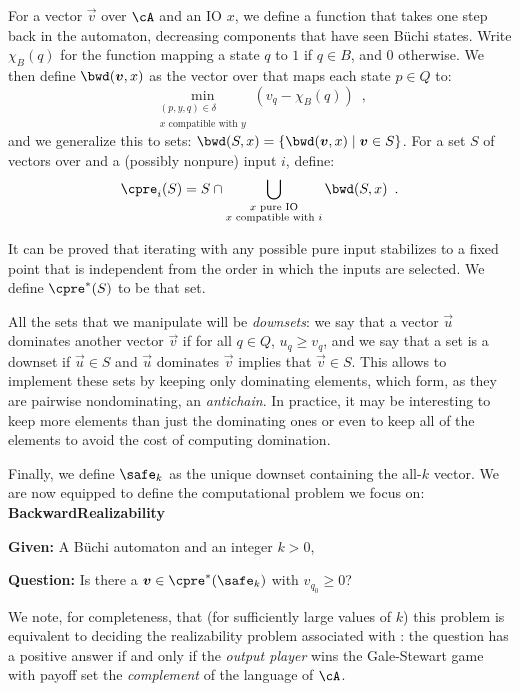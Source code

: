 \documentclass[runningheads,a4paper]{llncs}
\begin{document}
For a vector \(\vec{v}\) over \(\cA\) and an IO \(x\), we define a function that takes
one step back in the automaton, decreasing components that have seen Büchi
states.  Write \(\chi_B(q)\) for the function mapping a state \(q\) to \(1\) if
\(q \in B\), and \(0\) otherwise.  We then define \(\bwd(\vec{v}, x)\) as the vector
over \cA that maps each state \(p \in Q\) to:
\[\min_{\substack{(p, y, q) \in \delta\\ x \text{ compatible with } y}} \left(v_q -
  \chi_B(q)\right)\enspace,\]
and we generalize this to sets: \(\bwd(S, x) = \{\bwd(\vec{v}, x) \mid \vec{v}
\in S\}\).
%
For a set \(S\) of vectors over \cA and a (possibly nonpure) input \(i\), define:
\[\cpre_i(S) = S \cap \bigcup_{\substack{x \text{ pure IO}\\x \text{ compatible with } i}} \bwd(S, x)\enspace.\]

It can be proved that iterating \cpre with any possible pure input stabilizes to
a fixed point that is independent from the order in which the inputs are
selected.  We define \(\cpre^*(S)\) to be that set.

All the sets that we manipulate will be \emph{downsets}: we say that a vector
\(\vec{u}\) dominates another vector \(\vec{v}\) if for all \(q \in Q\),
\(u_q \geq v_q\), and we say that a set is a downset if \(\vec{u} \in S\) and
\(\vec{u}\) dominates \(\vec{v}\) implies that \(\vec{v} \in S\).  This allows to
implement these sets by keeping only dominating elements, which form, as they
are pairwise nondominating, an \emph{antichain}.  In practice, it may be
interesting to keep more elements than just the dominating ones or even to keep
all of the elements to avoid the cost of computing domination.

Finally, we define \(\safe_k\) as the unique downset containing the all-\(k\)
vector.
We are now equipped to define the computational problem we focus on:\\[1em]
\textbf{BackwardRealizability}
\begin{compactitem}
\item \textbf{Given:} A Büchi automaton \cA and an integer \(k > 0\),
\item \textbf{Question:} Is there a \(\vec{v} \in \cpre^*(\safe_k)\) with \(v_{q_0} \geq
  0\)?
\end{compactitem}

We note, for completeness, that (for sufficiently large values of $k$) this
problem is equivalent to deciding the realizability problem associated with
\cA: the question has a positive answer if and only if the \emph{output player} wins the
Gale-Stewart game with payoff set the \emph{complement} of the language of \(\cA\).
\end{document}

